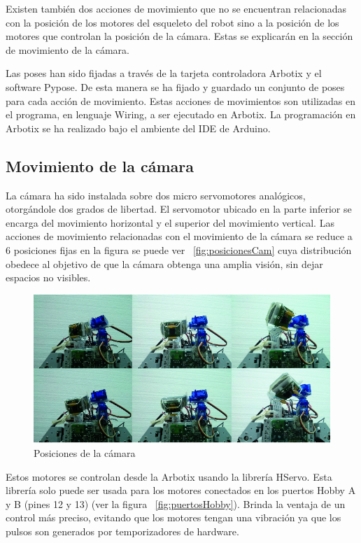 Existen también dos acciones de movimiento que no se encuentran relacionadas con la posición de los motores del esqueleto del robot sino a la posición de los motores que controlan la posición de la cámara. Estas se explicarán en la sección de movimiento de la cámara.

Las poses han sido fijadas a través de la tarjeta controladora Arbotix y el software Pypose. De esta manera se ha fijado y guardado un conjunto de poses para cada acción de movimiento. Estas acciones de movimientos son utilizadas en el programa, en lenguaje Wiring, a ser ejecutado en Arbotix. La programación en Arbotix se ha realizado bajo el ambiente del IDE de Arduino. 


\subsection{Movimiento de la cámara}
La cámara ha sido instalada sobre dos micro servomotores analógicos, otorgándole dos grados de libertad. El servomotor ubicado en la parte inferior se encarga del movimiento horizontal y el superior del movimiento vertical. Las acciones de movimiento relacionadas con el movimiento de la cámara se reduce a 6 posiciones fijas en la figura se puede ver ~\ref{fig:posicionesCam} cuya distribución obedece al objetivo de que la cámara obtenga una amplia visión, sin dejar espacios no visibles. 



\begin{figure}[hbtp]
\label{posicionesCam}
\centering
\includegraphics[scale=0.5]{imagenes/Pantallazo.png}
\caption{Posiciones de la cámara }
\end{figure}

Estos motores se controlan desde la Arbotix usando la librería HServo. Esta librería solo puede ser usada para los motores conectados en los puertos Hobby A y B (pines 12 y 13) (ver la figura ~\ref{fig:puertosHobby}). Brinda la ventaja de un control más preciso, evitando que los motores tengan una vibración ya que los pulsos son generados por temporizadores de hardware. 


